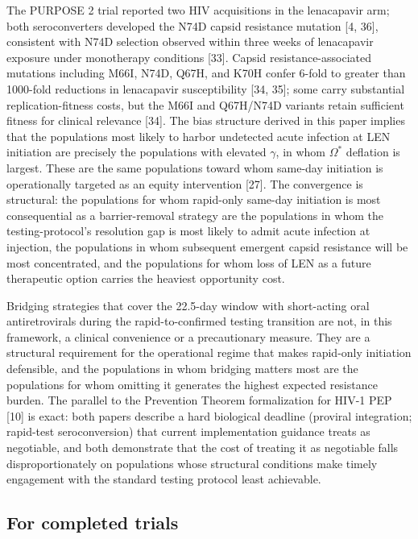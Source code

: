 \documentclass[12pt]{article}
\begin{document}
The PURPOSE 2 trial reported two HIV acquisitions in the lenacapavir arm; both seroconverters developed the N74D capsid resistance mutation [4, 36], consistent with N74D selection observed within three weeks of lenacapavir exposure under monotherapy conditions [33]. Capsid resistance-associated mutations including M66I, N74D, Q67H, and K70H confer 6-fold to greater than 1000-fold reductions in lenacapavir susceptibility [34, 35]; some carry substantial replication-fitness costs, but the M66I and Q67H/N74D variants retain sufficient fitness for clinical relevance [34]. The bias structure derived in this paper implies that the populations most likely to harbor undetected acute infection at LEN initiation are precisely the populations with elevated $\gamma$, in whom $\Omega^*$ deflation is largest. These are the same populations toward whom same-day initiation is operationally targeted as an equity intervention [27]. The convergence is structural: the populations for whom rapid-only same-day initiation is most consequential as a barrier-removal strategy are the populations in whom the testing-protocol's resolution gap is most likely to admit acute infection at injection, the populations in whom subsequent emergent capsid resistance will be most concentrated, and the populations for whom loss of LEN as a future therapeutic option carries the heaviest opportunity cost.

Bridging strategies that cover the 22.5-day window with short-acting oral antiretrovirals during the rapid-to-confirmed testing transition are not, in this framework, a clinical convenience or a precautionary measure. They are a structural requirement for the operational regime that makes rapid-only initiation defensible, and the populations in whom bridging matters most are the populations for whom omitting it generates the highest expected resistance burden. The parallel to the Prevention Theorem formalization for HIV-1 PEP [10] is exact: both papers describe a hard biological deadline (proviral integration; rapid-test seroconversion) that current implementation guidance treats as negotiable, and both demonstrate that the cost of treating it as negotiable falls disproportionately on populations whose structural conditions make timely engagement with the standard testing protocol least achievable.

\subsection{For completed trials}
\end{document}
